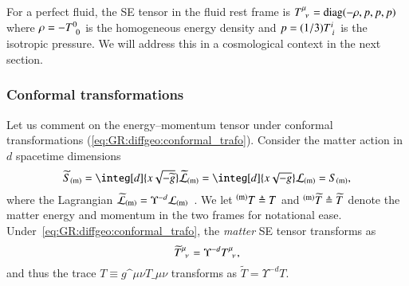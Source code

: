     For a perfect fluid, the SE tensor in the fluid rest frame is $T\indices{^\mu_\nu}= \text{diag}(-\rho, p, p, p)$ where $\rho=-T\iud{0}{0}$ is the homogeneous energy density and $p= (1/3) T\iud{i}{i}$ is the isotropic pressure. We will address this in a cosmological context in the next section.


    \subsubsection{Conformal transformations}
        {
        \newcommand\cfac{\Upsilon}
        \newcommand\wt{\widetilde}
        Let us comment on the energy--momentum tensor under conformal transformations (\cref{eq:GR:diffgeo:conformal_trafo}). Consider the matter action in $d$ spacetime dimensions
        \begin{equation}\label{eq:GR:einstein:matter_action_conformal}
            \widetilde{S}\ped{(m)} = \integ[d]{x\sqrt{-\wt{g}}} \wt{\mathcal{L}}\ped{(m)} = \integ[d]{x\sqrt{-g}} \mathcal{L}\ped{(m)} = S\ped{(m)},
        \end{equation}
        where the Lagrangian $\wt{\mathcal{L}}\ped{(m)}=\Upsilon^{-d}\mathcal{L}\ped{(m)}$~\citep{dabrowskiConformalTransformationsConformal2009}. %
        We let ${}^\mathrm{(m)}T\triangleq T$ and ${}\ap{(m)}\wt{T}\tmpequiv \wt{T}$ denote the matter energy and momentum in the two frames for notational ease. %
        Under~\cref{eq:GR:diffgeo:conformal_trafo}, the \emph{matter} SE tensor transforms as
        \begin{equation}
            {\wt{T}\indices{^\mu_\nu} }= \cfac^{-d}{T\indices{^\mu_\nu}},
        \end{equation}
        and thus the trace $T \equiv g\^{\mu\nu}{T\_{\mu\nu}}$ transforms as $ \wt{T} = \cfac^{-d} T$. %

}
